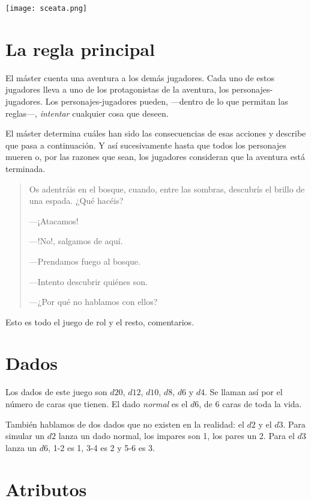\begin{multicols}{2}



\texttt{[image: sceata.png]}

\section{La regla principal}

El máster cuenta una aventura a los demás jugadores. Cada uno de estos jugadores
lleva a uno de los protagonistas de la aventura, los personajes-jugadores.
Los personajes-jugadores pueden, ---dentro de lo que permitan las reglas---,
\emph{intentar} cualquier cosa que deseen.

El máster determina cuáles han sido las consecuencias de esas acciones y describe
que pasa a continuación. Y así sucesivamente hasta que todos los personajes mueren
o, por las razones que sean, los jugadores consideran que la aventura está terminada.

\begin{quotation}
Os adentráis en el bosque, cuando, entre las sombras, descubrís el brillo de una
espada. ¿Qué hacéis?

---¡Atacamos!

---!No!, salgamos de aquí.

---Prendamos fuego al bosque.

---Intento descubrir quiénes son.

---¿Por qué no hablamos con ellos?
\end{quotation}

Esto es todo el juego de rol y el resto, comentarios.

\section{Dados}

Los dados de este juego son $d20$, $d12$, $d10$, $d8$, $d6$ y $d4$. Se llaman así por el
número de caras que tienen. El dado \emph{normal} es el $  d6$, de 6 caras de toda
la vida.

También hablamos de dos dados que no existen en la realidad: el $d2$ y el $d3$. Para simular
un $d2$ lanza un dado normal, los impares son 1, los pares un 2. Para el $d3$ lanza un $d6$,
1-2 es 1, 3-4 es 2 y 5-6 es 3.

\section{Atributos}\label{}


\end{multicols}
